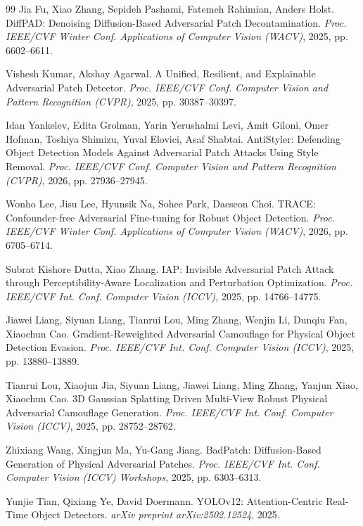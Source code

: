 \documentclass[a4paper,fleqn]{cas-dc}
\begin{document}
\begin{thebibliography}{99}
 Jia Fu, Xiao Zhang, Sepideh Pashami, Fatemeh Rahimian, Anders Holst. DiffPAD: Denoising Diffusion-Based Adversarial Patch Decontamination. \emph{Proc. IEEE/CVF Winter Conf. Applications of Computer Vision (WACV)}, 2025, pp. 6602--6611.

 Vishesh Kumar, Akshay Agarwal. A Unified, Resilient, and Explainable Adversarial Patch Detector. \emph{Proc. IEEE/CVF Conf. Computer Vision and Pattern Recognition (CVPR)}, 2025, pp. 30387--30397.

 Idan Yankelev, Edita Grolman, Yarin Yerushalmi Levi, Amit Giloni, Omer Hofman, Toshiya Shimizu, Yuval Elovici, Asaf Shabtai. AntiStyler: Defending Object Detection Models Against Adversarial Patch Attacks Using Style Removal. \emph{Proc. IEEE/CVF Conf. Computer Vision and Pattern Recognition (CVPR)}, 2026, pp. 27936--27945.

 Wonho Lee, Jisu Lee, Hyunsik Na, Sohee Park, Daeseon Choi. TRACE: Confounder-free Adversarial Fine-tuning for Robust Object Detection. \emph{Proc. IEEE/CVF Winter Conf. Applications of Computer Vision (WACV)}, 2026, pp. 6705--6714.

 Subrat Kishore Dutta, Xiao Zhang. IAP: Invisible Adversarial Patch Attack through Perceptibility-Aware Localization and Perturbation Optimization. \emph{Proc. IEEE/CVF Int. Conf. Computer Vision (ICCV)}, 2025, pp. 14766--14775.

 Jiawei Liang, Siyuan Liang, Tianrui Lou, Ming Zhang, Wenjin Li, Dunqiu Fan, Xiaochun Cao. Gradient-Reweighted Adversarial Camouflage for Physical Object Detection Evasion. \emph{Proc. IEEE/CVF Int. Conf. Computer Vision (ICCV)}, 2025, pp. 13880--13889.

 Tianrui Lou, Xiaojun Jia, Siyuan Liang, Jiawei Liang, Ming Zhang, Yanjun Xiao, Xiaochun Cao. 3D Gaussian Splatting Driven Multi-View Robust Physical Adversarial Camouflage Generation. \emph{Proc. IEEE/CVF Int. Conf. Computer Vision (ICCV)}, 2025, pp. 28752--28762.

 Zhixiang Wang, Xingjun Ma, Yu-Gang Jiang. BadPatch: Diffusion-Based Generation of Physical Adversarial Patches. \emph{Proc. IEEE/CVF Int. Conf. Computer Vision (ICCV) Workshops}, 2025, pp. 6303--6313.

 Yunjie Tian, Qixiang Ye, David Doermann. YOLOv12: Attention-Centric Real-Time Object Detectors. \emph{arXiv preprint arXiv:2502.12524}, 2025.


\end{thebibliography}
\end{document}
